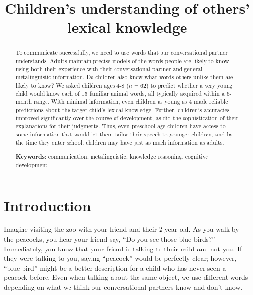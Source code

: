 \documentclass[10pt, letterpaper]{article}
\title{Children's understanding of others' lexical knowledge}
\begin{document}
\maketitle

\begin{abstract}
To communicate successfully, we need to use words that our
conversational partner understands. Adults maintain precise models of
the words people are likely to know, using both their experience with
their conversational partner and general metalinguistic information. Do
children also know what words others unlike them are likely to know? We
asked children ages 4-8 (\(n\) = 62) to predict whether a very young
child would know each of 15 familiar animal words, all typically
acquired within a 6-month range. With minimal information, even children
as young as 4 made reliable predictions about the target child's lexical
knowledge. Further, children's accuracies improved significantly over
the course of development, as did the sophistication of their
explanations for their judgments. Thus, even preschool age children have
access to some information that would let them tailor their speech to
younger children, and by the time they enter school, children may have
just as much information as adults.

\textbf{Keywords:}
communication, metalinguistic, knowledge reasoning, cognitive
development
\end{abstract}

\hypertarget{introduction}{%
\section{Introduction}\label{introduction}}

Imagine visiting the zoo with your friend and their 2-year-old. As you
walk by the peacocks, you hear your friend say, ``Do you see those blue
birds?'' Immediately, you know that your friend is talking to their
child and not you. If they were talking to you, saying ``peacock'' would
be perfectly clear; however, ``blue bird'' might be a better description
for a child who has never seen a peacock before. Even when talking about
the same object, we use different words depending on what we think our
conversational partners know and don't know.
\end{document}
